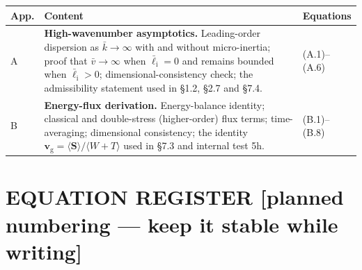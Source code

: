 \documentclass[11pt,a4paper]{article}
\newcommand{\bp}[1]{\textcolor{accent}{\textsf{\footnotesize [#1]}}}
\begin{document}
\begin{tabularx}{\textwidth}{@{}L{1.5cm} Y L{3.4cm}@{}}
\toprule
App. & Content & Equations \\
\midrule
A & \textbf{High-wavenumber asymptotics.} Leading-order dispersion as $\bar k\to\infty$ with and without micro-inertia; proof that $\bar v\to\infty$ when $\bar\ell_{\mathrm i}=0$ and remains bounded when $\bar\ell_{\mathrm i}>0$; dimensional-consistency check; the admissibility statement used in \S1.2, \S2.7 and \S7.4. & (A.1)--(A.6) \\
B & \textbf{Energy-flux derivation.} Energy-balance identity; classical and double-stress (higher-order) flux terms; time-averaging; dimensional consistency; the identity $\bm v_{\mathrm g}=\langle\bm S\rangle/\langle W+T\rangle$ used in \S7.3 and internal test 5h. & (B.1)--(B.8) \\
\bottomrule
\end{tabularx}

\newpage
\section{EQUATION REGISTER \bp{planned numbering --- keep it stable while writing}}
\end{document}
